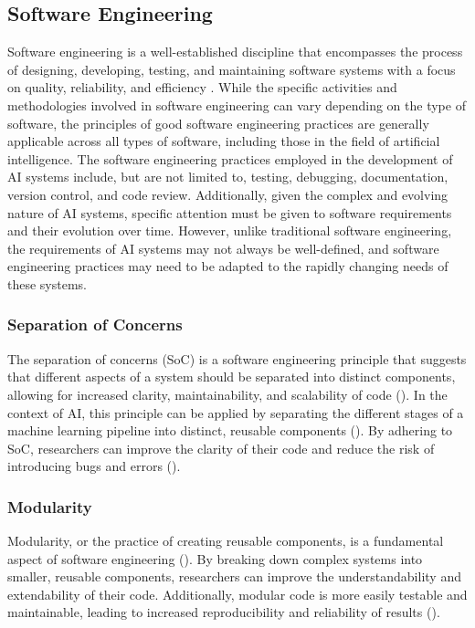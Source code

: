 \subsection{Software Engineering}
Software engineering is a well-established discipline that encompasses the process of designing, developing, testing, and maintaining software systems with a focus on quality, reliability, and efficiency \cite{pressman2010software}. While the specific activities and methodologies involved in software engineering can vary depending on the type of software, the principles of good software engineering practices are generally applicable across all types of software, including those in the field of artificial intelligence. The software engineering practices employed in the development of AI systems include, but are not limited to, testing, debugging, documentation, version control, and code review. Additionally, given the complex and evolving nature of AI systems, specific attention must be given to software requirements and their evolution over time. However, unlike traditional software engineering, the requirements of AI systems may not always be well-defined, and software engineering practices may need to be adapted to the rapidly changing needs of these systems.

\subsubsection{Separation of Concerns}
 The separation of concerns (SoC) is a software engineering principle that suggests that different aspects of a system should be separated into distinct components, allowing for increased clarity, maintainability, and scalability of code (\cite{pressman2010software, de2002importance}). In the context of AI, this principle can be applied by separating the different stages of a machine learning pipeline into distinct, reusable components (\cite{mo2016decoupling,mo2016decoupling,pressman2010software, de2002importance}). By adhering to SoC, researchers can improve the clarity of their code and reduce the risk of introducing bugs and errors (\cite{mo2016decoupling,mo2016decoupling,pressman2010software, de2002importance}).

\subsubsection{Modularity}
Modularity, or the practice of creating reusable components, is a fundamental aspect of software engineering (\cite{pressman2010software}). By breaking down complex systems into smaller, reusable components, researchers can improve the understandability and extendability of their code. Additionally, modular code is more easily testable and maintainable, leading to increased reproducibility and reliability of results (\cite{amershi2019software,pressman2010software}). 
